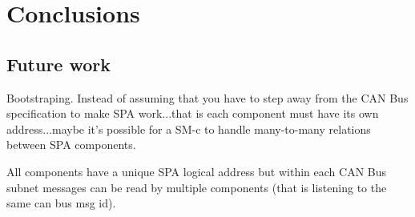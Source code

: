 \section{Conclusions}
\subsection{Future work}
Bootstraping. Instead of assuming that you have to step away from the CAN Bus
specification to make SPA work...that is each component must have its own
address...maybe it's possible for a SM-c to handle many-to-many relations
between SPA components.

All components have a unique SPA logical address but within each CAN Bus subnet
messages can be read by multiple components (that is listening to the same can
bus msg id).
